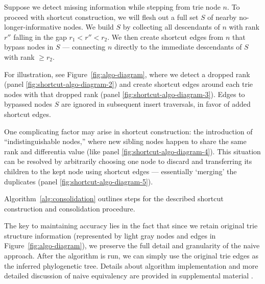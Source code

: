 Suppose we detect missing information while stepping from trie node $n$.
To proceed with shortcut construction, we will flesh out a full set $S$ of nearby no-longer-informative nodes.
We build $S$ by collecting all descendants of $n$ with rank $r''$ falling in the gap $r_1 < r'' < r_2$.
We then create shortcut edges from $n$ that bypass nodes in $S$ --- connecting $n$ directly to the immediate descendants of $S$ with rank $\geq r_2$.

For illustration, see Figure~\ref{fig:algo-diagram}, where we detect a dropped rank (panel \ref{fig:shortcut-algo-diagram-2}) and create shortcut edges around each trie nodes with that dropped rank (panel \ref{fig:shortcut-algo-diagram-3}).
Edges to bypassed nodes $S$ are ignored in subsequent insert traversals, in favor of added shortcut edges.

One complicating factor may arise in shortcut construction: the introduction of ``indistinguishable nodes,'' where new sibling nodes happen to share the same rank and differentia value (like panel \ref{fig:shortcut-algo-diagram-4}).
This situation can be resolved by arbitrarily choosing one node to discard and transferring its children to the kept node using shortcut edges --- essentially `merging' the duplicates (panel \ref{fig:shortcut-algo-diagram-5}).

Algorithm~\ref{alg:consolidation} outlines steps for the described shortcut construction and consolidation procedure.



The key to maintaining accuracy lies in the fact that since we retain original trie structure information (represented by light gray nodes and edges in Figure~\ref{fig:algo-diagram}), we preserve the full detail and granularity of the naive approach.
After the algorithm is run, we can simply use the original trie edges as the inferred phylogenetic tree.
Details about algorithm implementation and more detailed discussion of naive equivalency are provided in supplemental material \citep{supplemental}.

